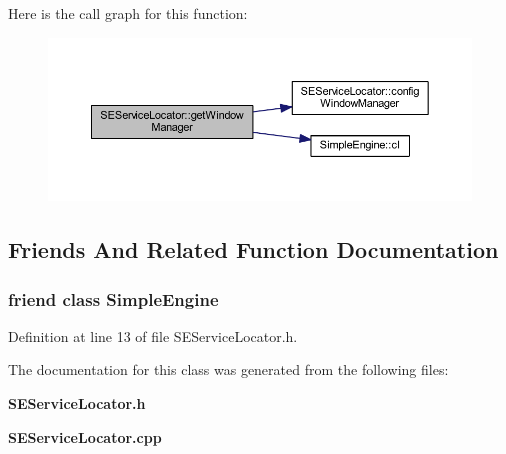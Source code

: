 Here is the call graph for this function\+:
\nopagebreak
\begin{figure}[H]
\begin{center}
\leavevmode
\includegraphics[width=350pt]{class_s_e_service_locator_add7fb54ea8342853af6fde0f27aefd73_cgraph}
\end{center}
\end{figure}




\subsection{Friends And Related Function Documentation}
\subsubsection[{Simple\+Engine}]{\setlength{\rightskip}{0pt plus 5cm}friend class {\bf Simple\+Engine}\hspace{0.3cm}{\ttfamily [friend]}}\label{class_s_e_service_locator_a78f124dc450d0c32033f3435360629f4}


Definition at line 13 of file S\+E\+Service\+Locator.\+h.



The documentation for this class was generated from the following files\+:\begin{DoxyCompactItemize}
\item 
{\bf S\+E\+Service\+Locator.\+h}\item 
{\bf S\+E\+Service\+Locator.\+cpp}\end{DoxyCompactItemize}
